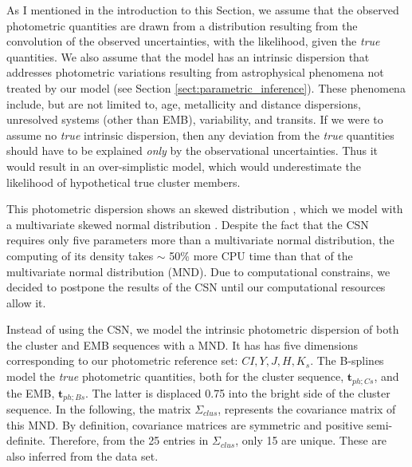 {\color{blue}
As I mentioned in the introduction to this Section, we assume that the observed photometric quantities are drawn from a distribution resulting from the convolution of the observed uncertainties, with the likelihood, given the \emph{true} quantities. We also assume that the model has an intrinsic dispersion that addresses photometric variations resulting from astrophysical phenomena not treated by our model (see Section \ref{sect:parametric_inference}). These phenomena include, but are not limited to, age, metallicity and distance dispersions, unresolved systems (other than EMB), variability, and transits. If we were to assume no \emph{true} intrinsic dispersion, then any deviation from the \emph{true} quantities should have to be explained \emph{only} by the observational uncertainties. Thus it would result in an over-simplistic model, which would underestimate the likelihood of hypothetical true cluster members. 

This photometric dispersion shows an skewed distribution \cite[see Figure 2 of][which I reproduce in Fig. \ref{fig:luminosity_dispersion}]{2008ASPC..384..200H}, which we model with a multivariate skewed normal distribution \cite[CSN, see for example][]{Gonzalez-Farias2004,Gupta2004}. Despite the fact that the CSN requires only five parameters more than a multivariate normal distribution, the computing of its density takes $\sim$ 50\% more CPU time than that of the multivariate normal distribution (MND). Due to computational constrains, we decided to postpone the results of the CSN until our computational resources allow it. 

Instead of using the CSN, we model the intrinsic photometric  dispersion of both the cluster and EMB sequences with a MND. It has has five dimensions corresponding to our photometric reference set: $CI,Y,J,H,K_s$. The B-splines model the \emph{true} photometric quantities, both for the cluster sequence, $\mathbf{t}_{ph;Cs}$, and the EMB, $\mathbf{t}_{ph;Bs}$. The latter is displaced 0.75 into the bright side of the cluster sequence. In the following, the matrix $\Sigma_{clus}$, represents the covariance matrix of this MND. By definition, covariance matrices are symmetric and positive semi-definite. Therefore, from the 25 entries in $\Sigma_{clus}$, only 15 are unique. These are also inferred from the data set.
}

